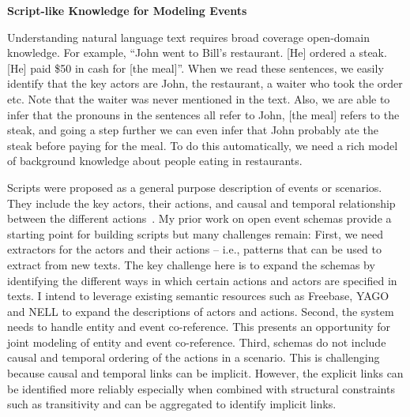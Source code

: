 \documentclass[a4paper,11pt,onecolumn]{article}
\begin{document}
{\bf Script-like Knowledge for Modeling Events}

Understanding natural language text requires broad coverage open-domain knowledge. For example, ``John went to Bill's restaurant. [He] ordered a steak. [He] paid \$50 in cash for [the meal]''. When we read these sentences, we easily identify that the key actors are John, the restaurant, a waiter who took the order etc. Note that the waiter was never mentioned in the text. Also, we are able to infer that the pronouns in the sentences all refer to John, [the meal] refers to the steak, and going a step further we can even infer that John probably ate the steak before paying for the meal. To do this automatically, we need a rich model of background knowledge about people eating in restaurants.


Scripts were proposed as a general purpose description of events or scenarios. They include the key actors, their actions, and causal and temporal relationship between the different actions~\cite{schank-scripts75}. My prior work on open event schemas provide a starting point for building scripts but many challenges remain: First, we need extractors for the actors and their actions -- i.e., patterns that can be used to extract from new texts. The key challenge here is to expand the schemas by identifying the different ways in which certain actions and actors are specified in texts. I intend to leverage existing semantic resources such as Freebase, YAGO and NELL to expand the descriptions of actors and actions. Second, the system needs to handle entity and event co-reference. This presents an opportunity for joint modeling of entity and event co-reference. Third, schemas do not include causal and temporal ordering of the actions in a scenario. This is challenging because causal and temporal links can be implicit. However, the explicit links can be identified more reliably especially when combined with structural constraints such as transitivity and can be aggregated to identify implicit links.
\end{document}
